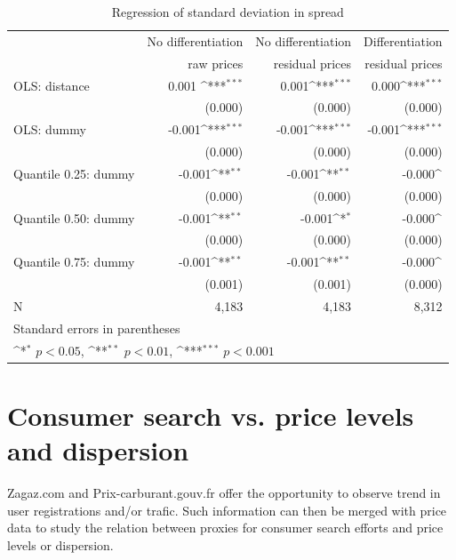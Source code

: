 \documentclass[11pt]{article}
\begin{document}
\begin{table}[htbp]\centering
\def\sym#1{\ifmmode^{#1}\else\(^{#1}\)\fi}
\caption{Regression of standard deviation in spread}
\begin{tabular}{lrrr}
\hline
\hline
{} & No differentiation & No differentiation & Differentiation \\
{} & raw prices & residual prices & residual prices \\
\hline
OLS: distance &  0.001 \sym{***}&      0.001\sym{***}&       0.000\sym{***}\\
{} &     (0.000)         &     (0.000)         &     (0.000)   \\
OLS: dummy &  -0.001\sym{***}&      -0.001\sym{***}&     -0.001\sym{***}\\
{} &    (0.000)     &     (0.000)         &     (0.000) \\
Quantile 0.25: dummy     &       -0.001\sym{**}&       -0.001\sym{**}&       -0.000\sym{}\\
{} &     (0.000)       &     (0.000)         &     (0.000)  \\
Quantile 0.50: dummy     &       -0.001\sym{**}&      -0.001\sym{*}&       -0.000\sym{}\\
{} &  (0.000)         &     (0.000)         &     (0.000)    \\
Quantile 0.75: dummy     &       -0.001\sym{**}&     -0.001\sym{**}&       -0.000\sym{}\\
{} &     (0.001)         &     (0.001)         &     (0.000)   \\
\hline
N      &     4,183         &     4,183      &     8,312    \\
\hline\hline
\multicolumn{4}{l}{\footnotesize Standard errors in parentheses}\\
\multicolumn{4}{l}{\footnotesize \sym{*} \(p<0.05\), \sym{**} \(p<0.01\), \sym{***} \(p<0.001\)}\\
\end{tabular}
\end{table}

\section{Consumer search vs. price levels and dispersion}

Zagaz.com and Prix-carburant.gouv.fr offer the opportunity to observe trend in user registrations and/or trafic. Such information can then be merged with price data to study the relation between proxies for consumer search efforts and price levels or dispersion.
\end{document}
